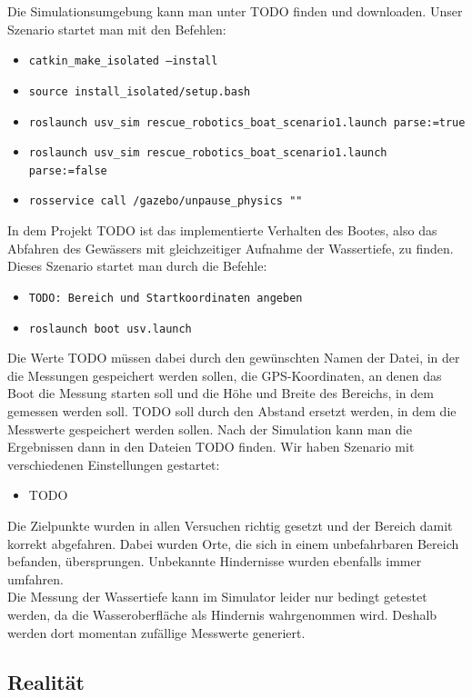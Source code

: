 \documentclass[11pt]{article}
\begin{document}
Die Simulationsumgebung kann man unter TODO finden und downloaden. Unser Szenario startet man mit den Befehlen:
\begin{itemize}
	\item \texttt{catkin\_make\_isolated --install}
	\item \texttt{source install\_isolated/setup.bash}
	\item \texttt{roslaunch usv\_sim rescue\_robotics\_boat\_scenario1.launch parse:=true}
	\item \texttt{roslaunch usv\_sim rescue\_robotics\_boat\_scenario1.launch parse:=false}
	\item \texttt{rosservice call /gazebo/unpause\_physics "{}"}
\end{itemize}
In dem Projekt TODO ist das implementierte Verhalten des Bootes, also das Abfahren des Gewässers mit gleichzeitiger Aufnahme der Wassertiefe, zu finden. Dieses Szenario startet man durch die Befehle:
\begin{itemize}
	\item \texttt{TODO: Bereich und Startkoordinaten angeben}
	\item \texttt{roslaunch boot usv.launch}
\end{itemize}
Die Werte TODO müssen dabei durch den gewünschten Namen der Datei, in der die Messungen gespeichert werden sollen, die GPS-Koordinaten, an denen das Boot die Messung starten soll und die Höhe und Breite des Bereichs, in dem gemessen werden soll. TODO soll durch den Abstand ersetzt werden, in dem die Messwerte gespeichert werden sollen. Nach der Simulation kann man die Ergebnissen dann in den Dateien TODO finden.
Wir haben Szenario mit verschiedenen Einstellungen gestartet:
\begin{itemize}
	\item TODO
\end{itemize}
Die Zielpunkte wurden in allen Versuchen richtig gesetzt und der Bereich damit korrekt abgefahren. Dabei wurden Orte, die sich in einem unbefahrbaren Bereich befanden, übersprungen. Unbekannte Hindernisse wurden ebenfalls immer umfahren.\\
Die Messung der Wassertiefe kann im Simulator leider nur bedingt getestet werden, da die Wasseroberfläche als Hindernis wahrgenommen wird. Deshalb werden dort momentan zufällige Messwerte generiert.

\subsection{Realität}
\end{document}
